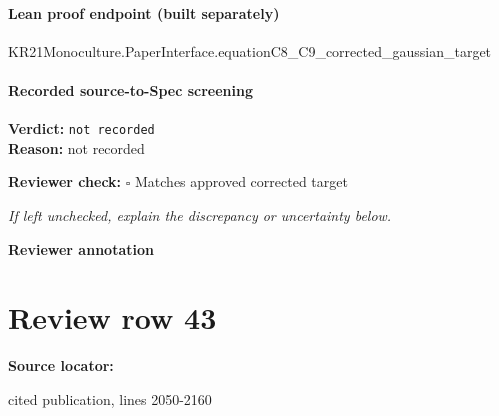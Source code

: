 \documentclass[10pt]{article}
\newcommand{\reviewerbox}{%
  \par\noindent\fbox{\parbox{0.96\linewidth}{\rule{0pt}{0.38in}}}\par
}
\newcommand{\reviewmatch}[1]{%
  \par\noindent\textbf{Reviewer check:} $\square$\; #1\par
  \noindent\emph{If left unchecked, explain the discrepancy or uncertainty below.}\par
}
\begin{document}
\paragraph{Lean proof endpoint (built separately)}\begin{ReviewVerbatim}
KR21Monoculture.PaperInterface.equationC8_C9_corrected_gaussian_target
\end{ReviewVerbatim}

\paragraph{Recorded source-to-Spec screening}
\textbf{Verdict:} \texttt{not recorded}
\\
\textbf{Reason:} not recorded
\reviewmatch{Matches approved corrected target}
\noindent\textbf{Reviewer annotation}\par
\reviewerbox
\clearpage
\hypertarget{source-claim-7a440699a84fb997}{}
\section*{Review row 43}
\textbf{Source locator:} {\footnotesize\raggedright cited publication, lines 2050-\allowbreak{}2160\par}
\end{document}
